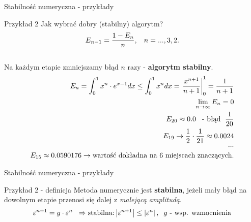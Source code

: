 \begin{frame}{Stabilność numeryczna - przykłady}
	\begin{exampleblock}{Przykład 2}
    Jak wybrać dobry (stabilny) algorytm?
    \\[-10pt]
    \[
    	E_{n-1} = \frac{1 - E_n}{n}, \hspace{.3cm} n = ..., 3, 2.
    \]
    \\[-8pt]
    Na każdym etapie zmniejszamy błąd $n$ razy - {\bf algorytm stabilny}.
    \\[-20pt]
    \begin{align*}
    	E_n = \int_0^1 x^n \cdot e^{x-1} dx \le \int_0^1 x^n dx =
        \left.
        	\frac{x^{n+1}}{n+1}
        \right|_0^1 = \frac{1}{n+1} \\
        \lim_{n \to \infty} E_n = 0 \\
        E_{20} \approx 0.0 \hspace{.3cm} \text{- błąd } \hspace{.1cm} \frac{1}{20} \\
        E_{19} \rightarrow \frac{1}{2} \cdot \frac{1}{21} \approx 0.0024 \\
        \\[-22pt]
        ... \\
        E_{15} \approx 0.0590176 \rightarrow \text{wartość dokładna na 6 miejscach znaczących.}
    \end{align*}
    \end{exampleblock}
\end{frame}
\begin{frame}{Stabilność numeryczna - przykłady}
	\begin{block}{Przykład 2 - definicja}
		Metoda numerycznie jest {\bf stabilna}, jeżeli mały błąd na dowolnym etapie przenosi się dalej z {\it malejącą amplitudą}.
        \[
        	\varepsilon^{n+1} = g \cdot \varepsilon^n \hspace{.2cm} 
            \Rightarrow \text{stabilna:}
            \left| \varepsilon^{n+1} \right| \le \left| \varepsilon^n \right|, \hspace{.2cm} g \text{ - wsp. wzmocnienia}
        \]
	\end{block}
\end{frame}

